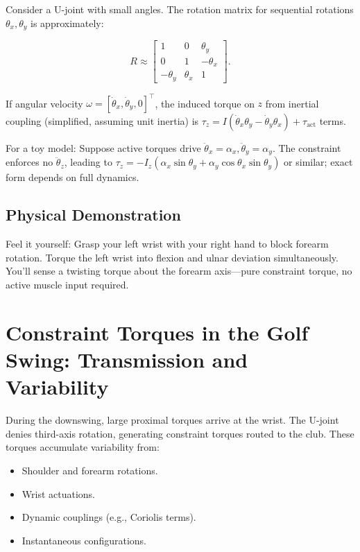 \documentclass[11pt]{article}
\begin{document}
Consider a U-joint with small angles. The rotation matrix for sequential rotations $\theta_x, \theta_y$ is approximately:

\begin{equation}
R \approx \begin{bmatrix}
1 & 0 & \theta_y \\
0 & 1 & -\theta_x \\
-\theta_y & \theta_x & 1
\end{bmatrix}.
\end{equation}

If angular velocity $\omega = [\dot{\theta}_x, \dot{\theta}_y, 0]^\top$, the induced torque on $z$ from inertial coupling (simplified, assuming unit inertia) is $\tau_z = I (\dot{\theta}_x \theta_y - \dot{\theta}_y \theta_x) + \tau_{\text{act}}$ terms.

For a toy model: Suppose active torques drive $\ddot{\theta}_x = \alpha_x, \ddot{\theta}_y = \alpha_y$. The constraint enforces no $\ddot{\theta}_z$, leading to $\tau_z = -I_z (\alpha_x \sin \theta_y + \alpha_y \cos \theta_x \sin \theta_y)$ or similar; exact form depends on full dynamics.

\subsection{Physical Demonstration}

Feel it yourself: Grasp your left wrist with your right hand to block forearm rotation. Torque the left wrist into flexion and ulnar deviation simultaneously. You'll sense a twisting torque about the forearm axis—pure constraint torque, no active muscle input required.

\section{Constraint Torques in the Golf Swing: Transmission and Variability}

During the downswing, large proximal torques arrive at the wrist. The U-joint denies third-axis rotation, generating constraint torques routed to the club. These torques accumulate variability from:
\begin{itemize}
    \item Shoulder and forearm rotations.
    \item Wrist actuations.
    \item Dynamic couplings (e.g., Coriolis terms).
    \item Instantaneous configurations.
\end{itemize}
\end{document}
